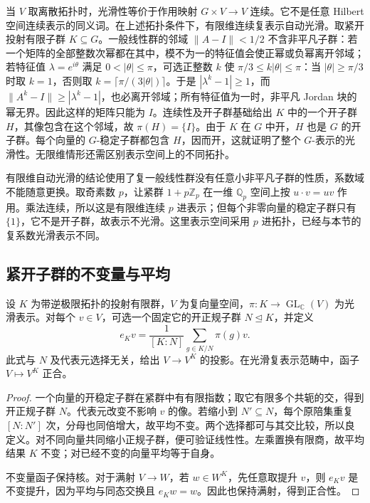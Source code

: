 当 \(V\) 取离散拓扑时，光滑性等价于作用映射 \(G\times V\to V\) 连续。它不是任意 Hilbert 空间连续表示的同义词。在上述拓扑条件下，有限维连续复表示自动光滑。取紧开投射有限子群 \(K\subseteq G\)。一般线性群的邻域 \(\|A-I\|<1/2\) 不含非平凡子群：若一个矩阵的全部整数次幂都在其中，模不为一的特征值会使正幂或负幂离开邻域；若特征值 \(\lambda=e^{i\theta}\) 满足 \(0<|\theta|\le\pi\)，可选正整数 \(k\) 使 \(\pi/3\le k|\theta|\le\pi\)：当 \(|\theta|\ge\pi/3\) 时取 \(k=1\)，否则取 \(k=\lceil\pi/(3|\theta|)\rceil\)。于是 \(|\lambda^k-1|\ge1\)，而 \(\|A^k-I\|\ge|\lambda^k-1|\)，也必离开邻域；所有特征值为一时，非平凡 Jordan 块的幂无界。因此这样的矩阵只能为 \(I\)。连续性及开子群基础给出 \(K\) 中的一个开子群 \(H\)，其像包含在这个邻域，故 \(\pi(H)=\{I\}\)。由于 \(K\) 在 \(G\) 中开，\(H\) 也是 \(G\) 的开子群。每个向量的 \(G\)-稳定子群都包含 \(H\)，因而开，这就证明了整个 \(G\)-表示的光滑性。无限维情形还需区别表示空间上的不同拓扑。

\ProseParagraphBreak
有限维自动光滑的结论使用了复一般线性群没有任意小非平凡子群的性质，系数域不能随意更换。取奇素数 \(p\)，让紧群 \(1+p\mathbb Z_p\) 在一维 \(\mathbb Q_p\) 空间上按 \(u\cdot v=uv\) 作用。乘法连续，所以这是有限维连续 \(p\) 进表示；但每个非零向量的稳定子群只有 \(\{1\}\)，它不是开子群，故表示不光滑。这里表示空间采用 \(p\) 进拓扑，已经与本节的复系数光滑表示不同。

\subsection{紧开子群的不变量与平均}
\label{b5:subsec:C03:02}

\begin{proposition}\label{b5:prop:compact-open-average}
	设 \(K\) 为带逆极限拓扑的投射有限群，\(V\) 为复向量空间，\(\pi:K\to\operatorname{GL}_{\mathbb C}(V)\) 为光滑表示。对每个 \(v\in V\)，可选一个固定它的开正规子群 \(N\trianglelefteq K\)，并定义
	\[
		e_Kv=\frac1{[K:N]}\sum_{g\in K/N}\pi(g)v.
	\]
	此式与 \(N\) 及代表元选择无关，给出 \(V\to V^K\) 的投影。在光滑复表示范畴中，函子 \(V\mapsto V^K\) 正合。
\end{proposition}
\begin{proof}
	一个向量的开稳定子群在紧群中有有限指数；取它有限多个共轭的交，得到开正规子群 \(N\)。代表元改变不影响 \(v\) 的像。若缩小到 \(N'\subseteq N\)，每个原陪集重复 \([N:N']\) 次，分母也同倍增大，故平均不变。两个选择都可与其交比较，所以良定义。对不同向量共同缩小正规子群，便可验证线性性。左乘置换有限商，故平均结果 \(K\) 不变；对已经不变的向量平均等于自身。

	不变量函子保持核。对于满射 \(V\to W\)，若 \(w\in W^K\)，先任意取提升 \(v\)，则 \(e_Kv\) 是不变提升，因为平均与同态交换且 \(e_Kw=w\)。因此也保持满射，得到正合性。
\end{proof}

